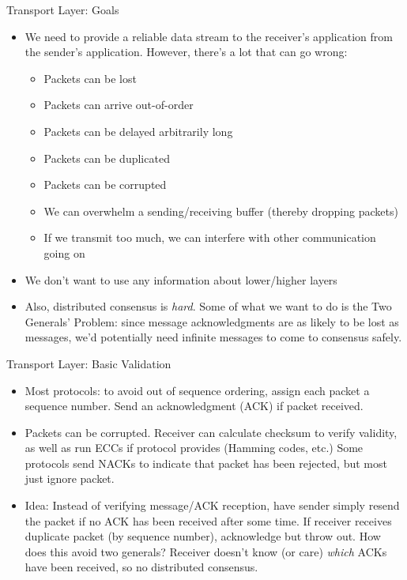 \documentclass{beamer}
\begin{document}
\begin{frame}[t]{Transport Layer: Goals}
    \begin{itemize}
        \item We need to provide a \alert{reliable data stream} to the receiver's application from the sender's application. However, there's a lot that can go wrong:
        \begin{itemize}
            \item \pause Packets can be lost
            \item \pause Packets can arrive out-of-order
            \item \pause Packets can be delayed arbitrarily long
            \item \pause Packets can be duplicated
            \item \pause Packets can be corrupted
            \item \pause We can overwhelm a sending/receiving buffer (thereby dropping packets)
            \item \pause If we transmit too much, we can interfere with other communication going on
        \end{itemize}
        \item \pause We don't want to use any information about lower/higher layers
        \item \pause Also, distributed consensus is \textit{hard}. Some of what we want to do is the \alert{Two Generals' Problem}: since message acknowledgments are as likely to be lost as messages, we'd potentially need infinite messages to come to consensus safely.
    \end{itemize}
\end{frame}

\begin{frame}[t]{Transport Layer: Basic Validation}
    \begin{itemize}
        \item Most protocols: to avoid out of sequence ordering, assign each packet a \alert{sequence number}. Send an \alert{acknowledgment} (ACK) if packet received.
        \item \pause Packets can be corrupted. Receiver can calculate \alert{checksum} to verify validity, as well as run ECCs if protocol provides (Hamming codes, etc.) Some protocols send NACKs to indicate that packet has been rejected, but most just ignore packet. 
        \item \pause Idea: Instead of verifying message/ACK reception, have sender simply resend the packet if no ACK has been received after some time. If receiver receives duplicate packet (by sequence number), acknowledge but throw out. \alert{How does this avoid two generals?} \pause Receiver doesn't know (or care) \textit{which} ACKs have been received, so no distributed consensus.
    \end{itemize}
\end{frame}
\end{document}
